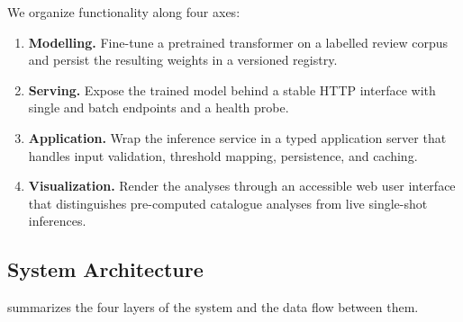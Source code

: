 \documentclass[11pt, a4paper]{article}
\begin{document}
We organize functionality along four axes:

\begin{enumerate}[leftmargin=1.4em, itemsep=2pt, topsep=4pt]
  \item \textbf{Modelling.} Fine-tune a pretrained transformer on a labelled review corpus and persist the resulting weights in a versioned registry.
  \item \textbf{Serving.} Expose the trained model behind a stable HTTP interface with single and batch endpoints and a health probe.
  \item \textbf{Application.} Wrap the inference service in a typed application server that handles input validation, threshold mapping, persistence, and caching.
  \item \textbf{Visualization.} Render the analyses through an accessible web user interface that distinguishes pre-computed catalogue analyses from live single-shot inferences.
\end{enumerate}

\subsection{System Architecture}

 summarizes the four layers of the system and the data flow between them.
\end{document}
